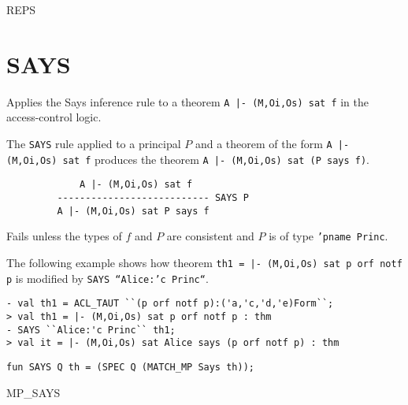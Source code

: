 \SEEALSO
REPS
\ENDDOC

\section{SAYS}




\egroup

\SYNOPSIS
Applies the Says inference rule to a theorem \texttt{A |- (M,Oi,Os) sat f}
in the access-control logic.

\DESCRIBE The \texttt{SAYS} rule applied to a principal $P$ and a
theorem of the form \texttt{A |- (M,Oi,Os) sat f} produces the theorem
\texttt{A |- (M,Oi,Os) sat (P says f)}.
\begin{verbatim}
             A |- (M,Oi,Os) sat f
         --------------------------- SAYS P
         A |- (M,Oi,Os) sat P says f
\end{verbatim}

\FAILURE
Fails unless the types of $f$ and $P$ are consistent and $P$ is of type
\texttt{'pname Princ}.

\EXAMPLE
The following example shows how theorem \texttt{th1 = |- (M,Oi,Os) sat
  p orf notf p} is modified by \texttt{SAYS ``Alice:'c Princ``}.
\begin{holboxed}
\begin{verbatim}
- val th1 = ACL_TAUT ``(p orf notf p):('a,'c,'d,'e)Form``;
> val th1 = |- (M,Oi,Os) sat p orf notf p : thm
- SAYS ``Alice:'c Princ`` th1;
> val it = |- (M,Oi,Os) sat Alice says (p orf notf p) : thm
\end{verbatim}
\end{holboxed}
\IMPLEMENTATION
\begin{holboxed}
\begin{verbatim}
fun SAYS Q th = (SPEC Q (MATCH_MP Says th));
\end{verbatim}
\end{holboxed}
\SEEALSO
MP\_SAYS
\ENDDOC

